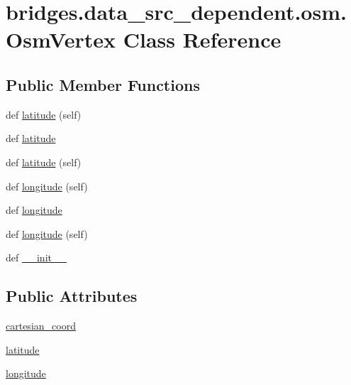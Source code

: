 \hypertarget{classbridges_1_1data__src__dependent_1_1osm_1_1_osm_vertex}{}\section{bridges.\+data\+\_\+src\+\_\+dependent.\+osm.\+Osm\+Vertex Class Reference}
\label{classbridges_1_1data__src__dependent_1_1osm_1_1_osm_vertex}
\subsection*{Public Member Functions}
\begin{DoxyCompactItemize}
\item 
def \mbox{\hyperlink{classbridges_1_1data__src__dependent_1_1osm_1_1_osm_vertex_a31eefda235d8c4dd065ee5200897b473}{latitude}} (self)
\item 
def \mbox{\hyperlink{classbridges_1_1data__src__dependent_1_1osm_1_1_osm_vertex_add07a32c4c5e0f4af70d790cffa9a6d9}{latitude}}
\item 
def \mbox{\hyperlink{classbridges_1_1data__src__dependent_1_1osm_1_1_osm_vertex_a31eefda235d8c4dd065ee5200897b473}{latitude}} (self)
\item 
def \mbox{\hyperlink{classbridges_1_1data__src__dependent_1_1osm_1_1_osm_vertex_aca0aff0932e5436a0f72e53a93fe8f42}{longitude}} (self)
\item 
def \mbox{\hyperlink{classbridges_1_1data__src__dependent_1_1osm_1_1_osm_vertex_acf84d4c73cbffae355ec49c03b3f48c7}{longitude}}
\item 
def \mbox{\hyperlink{classbridges_1_1data__src__dependent_1_1osm_1_1_osm_vertex_aca0aff0932e5436a0f72e53a93fe8f42}{longitude}} (self)
\item 
def \mbox{\hyperlink{classbridges_1_1data__src__dependent_1_1osm_1_1_osm_vertex_a64fa8f3bfc7df74b5fa93bcc7326e6ac}{\+\_\+\+\_\+init\+\_\+\+\_\+}}
\end{DoxyCompactItemize}
\subsection*{Public Attributes}
\begin{DoxyCompactItemize}
\item 
\mbox{\hyperlink{classbridges_1_1data__src__dependent_1_1osm_1_1_osm_vertex_a5f7c71b790312e337d344a311d5b0fae}{cartesian\+\_\+coord}}
\item 
\mbox{\hyperlink{classbridges_1_1data__src__dependent_1_1osm_1_1_osm_vertex_a2b346821c6310d148977b1b6212c4c59}{latitude}}
\item 
\mbox{\hyperlink{classbridges_1_1data__src__dependent_1_1osm_1_1_osm_vertex_a0dd0da0c52e3ca388cf8fbe5f613c273}{longitude}}
\end{DoxyCompactItemize}


